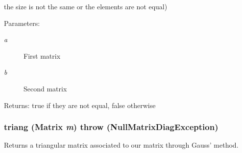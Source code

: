 the size is not the same or the elements are not equal) \begin{Desc}
\item[Parameters:]
\begin{description}
\item[{\em a}]First matrix \item[{\em b}]Second matrix \end{description}
\end{Desc}
\begin{Desc}
\item[Returns:]true if they are not equal, false otherwise \end{Desc}
\hypertarget{classgrassmann_1_1Matrix_38aaf4ec8160006c88070b706925492d}{
\subsubsection[triang]{ triang ({\bf Matrix} {\em m})  throw ({\bf NullMatrixDiagException})}}
\label{classgrassmann_1_1Matrix_38aaf4ec8160006c88070b706925492d}


Returns a triangular matrix associated to our matrix through Gauss' method. 

